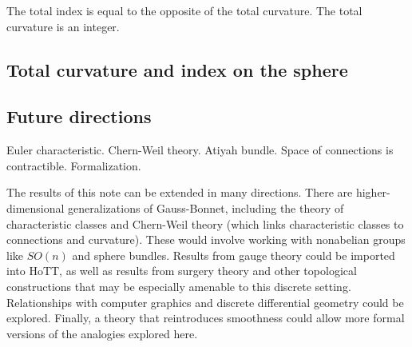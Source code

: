 \begin{mycor}
\label{thm:total_index_total_curvature}
The total index is equal to the opposite of the total curvature. The total curvature is an integer.
\end{mycor}

\subsection{Total curvature and index on the sphere}

\subsection{Future directions}
Euler characteristic. Chern-Weil theory. Atiyah bundle. Space of connections is contractible. Formalization.

The results of this note can be extended in many directions. There are higher-dimensional generalizations of Gauss-Bonnet, including the theory of characteristic classes and Chern-Weil theory (which links characteristic classes to connections and curvature). These would involve working with nonabelian groups like \( SO(n) \) and sphere bundles. Results from gauge theory could be imported into HoTT, as well as results from surgery theory and other topological constructions that may be especially amenable to this discrete setting. Relationships with computer graphics and discrete differential geometry\cite{crane_ddg}\cite{crane_connections} could be explored. Finally, a theory that reintroduces smoothness could allow more formal versions of the analogies explored here. 
